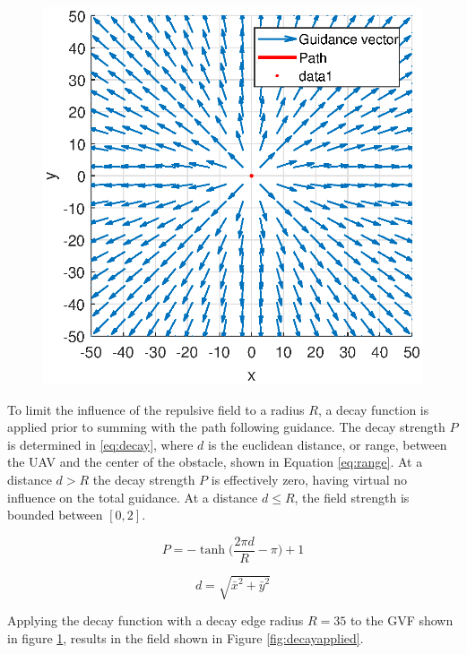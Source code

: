 \documentclass[conf]{new-aiaa}
\begin{document}
\begin{figure}[H]
	\centering
	\includegraphics[width=0.7\linewidth]{Figures/methods/normalizedRepulsive}
	\caption{}
	\label{fig:normalizedrepulsive}
\end{figure}

To limit the influence of the repulsive field to a radius $R$, a decay function is applied prior to summing with the path following guidance. The decay strength $P$ is determined in \ref{eq:decay}, where $d$ is the euclidean distance, or range, between the UAV and the center of the obstacle, shown in Equation \ref{eq:range}. At a distance $d>R$ the decay strength $P$ is effectively zero, having virtual no influence on the total guidance. At a distance $d\leq R$, the field strength is bounded between $[0,2]$.


\begin{equation}
\label{eq:decay}
P = -\tanh \bigg( \frac{2\pi d}{R}-\pi\bigg)+1
\end{equation}

\begin{equation}
\label{eq:range}
d = \sqrt{ \bar{x}^2+\bar{y}^2}
\end{equation}

Applying the decay function with a decay edge radius $R = 35$ to the GVF shown in figure \ref{fig:normalizedrepulsive}, results in the field shown in Figure \ref{fig:decayapplied}.


\end{document}
